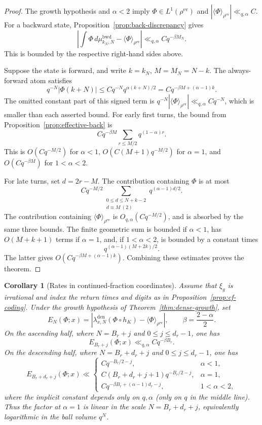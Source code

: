 \documentclass[11pt]{amsart}
\theoremstyle{definition}
\theoremstyle{plain}
\newtheorem{corollary}[definition]{Corollary}
\newcommand{\bwd}{\mathrm{bwd}}
\newcommand{\ev}{\mathrm{ev}}
\newcommand{\ang}{\langle}
\newcommand{\rang}{\rangle}
\begin{document}
\begin{proof}
The growth hypothesis and \(\alpha<2\) imply
\(\Phi\in L^1(\rho^{\ev})\) and
\(|\ang\Phi\rang_{\rho^{\ev}}|\ll_{q,\alpha}C\).
For a backward state, Proposition~\ref{prop:back-discrepancy} gives
\[
\left|\int \Phi\,d\mu^{\bwd}_{k_N,N}
       -\ang\Phi\rang_{\rho^{\ev}}\right|
 \ll_{q,\alpha}Cq^{-\beta M_N}.
\]
This is bounded by the respective right-hand sides above.

Suppose the state is forward, and write \(k=k_N\), \(M=M_N=N-k\).  The
always-forward atom satisfies
\[
q^{-N}|\Phi(k+N)|
 \le Cq^{-N}q^{\alpha(k+N)/2}
 =Cq^{-\beta M+(\alpha-1)k}.
\]
The omitted constant part of this signed term is
\(q^{-N}|\ang\Phi\rang_{\rho^{\ev}}|\ll_{q,\alpha}Cq^{-N}\), which is smaller
than each asserted bound.
For early first turns, the bound from
Proposition~\ref{prop:effective-back} is
\[
Cq^{-\beta M}
 \sum_{r\le M/2}q^{(1-\alpha)r}.
\]
This is \(O(Cq^{-M/2})\) for \(\alpha<1\),
\(O(C(M+1)q^{-M/2})\) for \(\alpha=1\), and
\(O(Cq^{-\beta M})\) for \(1<\alpha<2\).

For late turns, set \(d=2r-M\).  The contribution containing \(\Phi\) is at
most
\[
Cq^{-M/2}
 \sum_{\substack{0\le d\le N+k-2\\d\equiv M\ (2)}}
q^{(\alpha-1)d/2}.
\]
The contribution containing \(\ang\Phi\rang_{\rho^{\ev}}\) is
\(O_{q,\alpha}(Cq^{-M/2})\), and is absorbed by the same three bounds.
The finite geometric sum is bounded if \(\alpha<1\), has
\(O(M+k+1)\) terms if \(\alpha=1\), and, if \(1<\alpha<2\), is bounded by a
constant times
\[
q^{(\alpha-1)(M+2k)/2}.
\]
The latter gives \(O(Cq^{-\beta M+(\alpha-1)k})\).  Combining these estimates
proves the theorem.
\end{proof}

\begin{corollary}[Rates in continued-fraction coordinates]
\label{cor:cf-rates}
Assume that \(\xi_g\) is irrational and index the return times and digits as in
Proposition~\ref{prop:cf-coding}.  Under the growth hypothesis of
Theorem~\ref{thm:dense-growth}, set
\[
E_N(\Phi;x)=
\left|\lambda_{x,N}^{\mathrm{den}}(\Phi\circ h_K)
      -\ang\Phi\rang_{\rho^{\ev}}\right|,
\qquad \beta=\frac{2-\alpha}{2}.
\]
On the ascending half, where \(N=B_r+j\) and \(0\le j\le d_r-1\), one has
\[
E_{B_r+j}(\Phi;x)\ll_{q,\alpha}Cq^{-\beta B_r}.
\]
On the descending half, where \(N=B_r+d_r+j\) and
\(0\le j\le d_r-1\), one has
\[
E_{B_r+d_r+j}(\Phi;x)\ll
\begin{cases}
Cq^{-B_r/2-j},&\alpha<1,\\
C(B_r+d_r+j+1)q^{-B_r/2-j},&\alpha=1,\\
Cq^{-\beta B_r+(\alpha-1)d_r-j},&1<\alpha<2,
\end{cases}
\]
where the implicit constant depends only on \(q,\alpha\) (only on \(q\) in
the middle line).  Thus the factor at \(\alpha=1\) is linear in the scale
\(N=B_r+d_r+j\), equivalently logarithmic in the ball volume \(q^N\).
\end{corollary}
\end{document}
